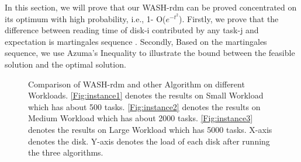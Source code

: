 \documentclass[conference]{IEEEtran}
\begin{document}
In this section, we will prove that our WASH-rdm can be proved concentrated on its optimum with high probability, i.e., 1- O($e^{-t^2}$). Firstly, we prove that the difference between reading time of disk-i contributed by any task-j and expectation is martingales sequence \cite{b12}. Secondly, Based on the martingales sequence, we use Azuma's Inequality to illustrate the bound between the feasible solution and the optimal solution.
\begin{figure}[!t]
	\centering
	\quad\quad %
	\quad\quad
	\vspace{-1ex}
	\caption{Comparison of WASH-rdm and other Algorithm on different Workloads. \ref{Fig:instance1} denotes the results on Small Workload which has about 500 tasks. \ref{Fig:instance2} denotes the results on Medium Workload which has about 2000 tasks.
	\ref{Fig:instance3} denotes the results on Large Workload which has 5000 tasks. X-axis denotes the disk. Y-axis denotes the load of each disk after running the three algorithms.}
	\label{Fig:instance}
	\vspace{-1ex}
\end{figure}
\end{document}

